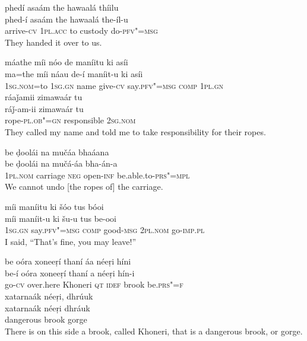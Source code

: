 \begin{exe}
\ex
\label{ex:7}
\glll phedí	asaám	the	hawaalá	thíilu \\
phed-í	asaám	the	hawaalá	the-íl-u \\
arrive-\textsc{cv}	\textsc{1pl.acc}	to	custody	do-\textsc{pfv"=msg} \\
\glt They handed it over to us.

\ex
\label{ex:8}
\glll máathe	míi	nóo	de	maníitu	ki	asíi \\
ma=the	míi	náau	de-í	maníit-u	ki	asíi \\
\textsc{1sg.nom}=to \textsc{1sg.gn}	name	give-\textsc{cv}	say.\textsc{pfv"=msg}	   \textsc{comp} \textsc{1pl.gn} \\
\glll ráaǰamii	zimawaár	tu \\
ráǰ-am-ii	zimawaár	tu \\
rope-\textsc{pl.ob"=gn}	responsible	\textsc{2sg.nom} \\
\glt They called my name and told me to take responsibility for their ropes.

\ex
\label{ex:9} 
\glll be	ḍoolái	na	mučáa	bhaáana \\
be	ḍoolái	na	mučá-áa	bha-án-a \\
\textsc{1pl.nom}	carriage \textsc{neg}	open-\textsc{inf}	be.able.to-\textsc{prs"=mpl} \\
\glt We cannot undo [the ropes of] the carriage.

\ex
\label{ex:10}
\glll míi	maníitu	ki	šóo	tus	bóoi \\
míi	maníit-u	ki	šu-u	tus	be-ooi \\
\textsc{1sg.gn}	say.\textsc{pfv"=msg} \textsc{comp}	good-\textsc{msg} \textsc{2pl.nom}	go-\textsc{imp.pl} \\
\glt I said, “That’s fine, you may leave!”

\ex
\label{ex:11}
\glll be	oóra	xoneeṛí	thaní	áa	néeṛi	híni \\
be-í	oóra	xoneeṛí	thaní	a	néeṛi	hín-i \\
go-\textsc{cv}	over.here	Khoneri	\textsc{qt}	\textsc{idef}	brook	be.\textsc{prs"=f} \\
\glll xatarnaák	néeṛi,	dhrúuk \\
xatarnaák	néeṛi	dhráuk \\
dangerous	brook	gorge \\
\glt There is on this side a brook, called Khoneri, that is a dangerous brook, or gorge.



\end{exe}
